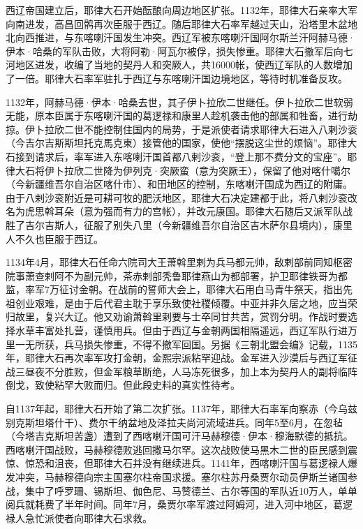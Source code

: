 西辽帝国建立后，耶律大石开始酝酿向周边地区扩张。1132年，耶律大石亲率大军向南进发，高昌回鹘再次臣服于西辽。随后耶律大石率军越过天山，沿塔里木盆地北向西推进，与东喀喇汗国发生冲突。西辽军被东喀喇汗国阿尔斯兰汗阿赫马德·伊本·哈桑的军队击败，大将阿勒·阿瓦尔被俘，损失惨重。耶律大石撤军后向七河地区进发，收编了当地的契丹人和突厥人，共16000帐，使西辽军队的人数增加了一倍。耶律大石率军驻扎于西辽与东喀喇汗国边境地区，等待时机准备反攻。

1132年，阿赫马德·伊本·哈桑去世，其子伊卜拉欣二世继任。伊卜拉欣二世软弱无能，原本臣属于东喀喇汗国的葛逻禄和康里人趁机袭击他的部属和牲畜，进行劫掠。伊卜拉欣二世不能控制住国内的局势，于是派使者请求耶律大石进入八剌沙衮（今吉尔吉斯斯坦托克馬克東）接管他的国家，使他“摆脱这尘世的烦恼”。耶律大石接到请求后，率军进入东喀喇汗国首都八剌沙衮，“登上那不费分文的宝座”。耶律大石将伊卜拉欣二世降为伊列克·突厥蛮（意为突厥王），保留了他对喀什噶尔（今新疆维吾尔自治区喀什市）、和田地区的控制，东喀喇汗国成为西辽的附庸。由于八剌沙衮附近是可耕可牧的肥沃地区，耶律大石决定建都于此，将八剌沙衮改名为虎思斡耳朵（意为强而有力的宫帐），并改元康国。耶律大石随后又派军队战胜了吉尔吉斯人，征服了别失八里（今新疆维吾尔自治区吉木萨尔县境内），康里人不久也臣服于西辽。

1134年4月，耶律大石任命六院司大王萧斡里剌为兵马都元帅，敌剌部前同知枢密院事萧查剌阿不为副元帅，茶赤剌部秃鲁耶律燕山为都部署，护卫耶律铁哥为都监，率军7万征讨金朝。在战前的誓师大会上，耶律大石用白马青牛祭天，指出先祖创业艰难，是由于后代君主耽于享乐致使社稷倾覆。中亚并非久居之地，应当荣归故里，复兴大辽。他又劝谕萧斡里剌要与士卒同甘共苦，赏罚分明。作战时要选择水草丰富处扎营，谨慎用兵。但由于西辽与金朝两国相隔遥远，西辽军队行进万里一无所获，兵马损失惨重，不得不撤军回国。另据《三朝北盟会编》记载，1135年，耶律大石再次率军攻打金朝，金熙宗派粘罕迎战。金军进入沙漠后与西辽军征战三昼夜不分胜败，但金军粮草断绝，人马冻死很多，加上本为契丹人的副将临阵倒戈，致使粘罕大败而归。但此段史料的真实性待考。

自1137年起，耶律大石开始了第二次扩张。1137年，耶律大石率军向察赤（今乌兹别克斯坦塔什干）、费尔干纳盆地及泽拉夫尚河流域进兵。同年5至6月，在忽毡（今塔吉克斯坦苦盏）遭到了西喀喇汗国可汗马赫穆德·伊本·穆海默德的抵抗。西喀喇汗国战败，马赫穆德败逃回撒马尔罕。这次战败使马黑木二世的臣民感到震惊、惊恐和沮丧，但耶律大石并没有继续进兵。1141年，西喀喇汗国与葛逻禄人爆发冲突，马赫穆德向宗主国塞尔柱帝国求援。塞尔柱苏丹桑贾尔动员伊斯兰诸国参战，集中了呼罗珊、锡斯坦、伽色尼、马赞德兰、古尔等国的军队近10万人，单单阅兵就耗费了半年时间。同年7月，桑贾尔率军渡过阿姆河，进入河中地区，葛逻禄人急忙派使者向耶律大石求救。

